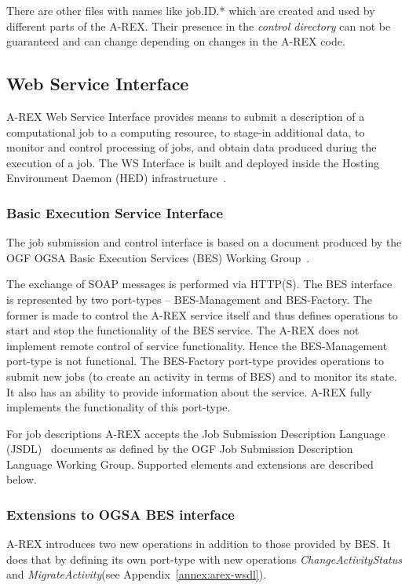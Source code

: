 \documentclass{article}                            %
\begin{document}
There are other files with names like job.ID.{*} which are created
and used by different parts of the A-REX. Their presence in the \textit{control
directory} can not be guaranteed and can change depending on changes
in the A-REX code.

\subsection{Web Service Interface}

A-REX Web Service Interface provides means to submit a description
of a computational job to a computing resource, to stage-in additional
data, to monitor and control processing of jobs, and obtain data produced
during the execution of a job. The WS Interface is built and deployed
inside the Hosting Environment Daemon (HED) infrastructure~\cite{hed}.

\subsubsection{Basic Execution Service Interface}

The job submission and control interface is based on a document produced
by the OGF OGSA Basic Execution Services (BES) Working Group~\cite{ogsa-bes}.

The exchange of SOAP messages is performed via HTTP(S). The BES interface
is represented by two port-types -- BES-Management and BES-Factory.
The former is made to control the A-REX service itself and thus defines
operations to start and stop the functionality of the BES service.
The A-REX does not implement remote control of service functionality.
Hence the BES-Management port-type is not functional. The BES-Factory
port-type provides operations to submit new jobs (to create an activity
in terms of BES) and to monitor its state. It also has an ability
to provide information about the service. A-REX fully implements the
functionality of this port-type.

For job descriptions A-REX accepts the Job Submission Description
Language (JSDL)~\cite{jsdl} documents as defined by the OGF Job Submission
Description Language Working Group. Supported elements and extensions
are described below.

\subsubsection{Extensions to OGSA BES interface}

A-REX introduces two new operations in addition to those provided by
BES. It does that by defining its own port-type with new operations
\emph{ChangeActivityStatus} and \emph{MigrateActivity}(see 
Appendix~\ref{annex:arex-wsdl}).
\end{document}
